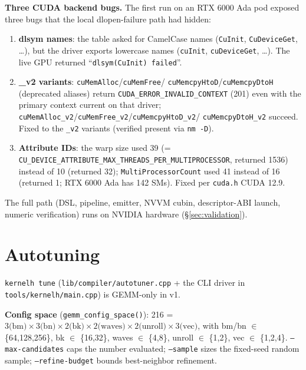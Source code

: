 \documentclass[10pt,twoside]{article}
\begin{document}
\textbf{Three CUDA backend bugs.} The first run on an RTX 6000 Ada pod exposed three bugs
that the local dlopen-failure path had hidden:
\begin{enumerate}
  \item \textbf{dlsym names}: the table asked for CamelCase names (\texttt{CuInit},
        \texttt{CuDeviceGet}, \dots), but the driver exports lowercase names (\texttt{cuInit},
        \texttt{cuDeviceGet}, \dots). The live GPU returned ``\texttt{dlsym(CuInit) failed}''.
  \item \textbf{\_v2 variants}: \texttt{cuMemAlloc}/\texttt{cuMemFree}/
        \texttt{cuMemcpyHtoD}/\texttt{cuMemcpyDtoH} (deprecated aliases) return
        \texttt{CUDA\_ERROR\_INVALID\_CONTEXT} (201) even with the primary context current on
        that driver; \texttt{cuMemAlloc\_v2}/\texttt{cuMemFree\_v2}/\texttt{cuMemcpyHtoD\_v2}/
        \texttt{cuMemcpyDtoH\_v2} succeed. Fixed to the \texttt{\_v2} variants (verified
        present via \texttt{nm -D}).
  \item \textbf{Attribute IDs}: the warp size used 39 (=
        \texttt{CU\_DEVICE\_ATTRIBUTE\_MAX\_THREADS\_PER\_MULTIPROCESSOR}, returned 1536)
        instead of 10 (returned 32); \texttt{MultiProcessorCount} used 41 instead of 16
        (returned 1; RTX 6000 Ada has 142 SMs). Fixed per \texttt{cuda.h} CUDA 12.9.
\end{enumerate}

The full path (DSL, pipeline, emitter, NVVM cubin, descriptor-ABI launch, numeric
verification) runs on NVIDIA hardware (\S\ref{sec:validation}).

\section{Autotuning}
\label{sec:autotune}

\texttt{kernelh tune} (\texttt{lib/compiler/autotuner.cpp} + the CLI driver in
\texttt{tools/kernelh/main.cpp}) is GEMM-only in v1.

\textbf{Config space} (\texttt{gemm\_config\_space()}): 216 = $3\text{(bm)} \times
3\text{(bn)} \times 2\text{(bk)} \times 2\text{(waves)} \times 2\text{(unroll)} \times
3\text{(vec)}$, with bm/bn $\in$ \{64,128,256\}, bk $\in$ \{16,32\}, waves $\in$ \{4,8\},
unroll $\in$ \{1,2\}, vec $\in$ \{1,2,4\}. \texttt{--max-candidates} caps the number
evaluated; \texttt{--sample} sizes the fixed-seed random sample; \texttt{--refine-budget}
bounds best-neighbor refinement.
\end{document}
